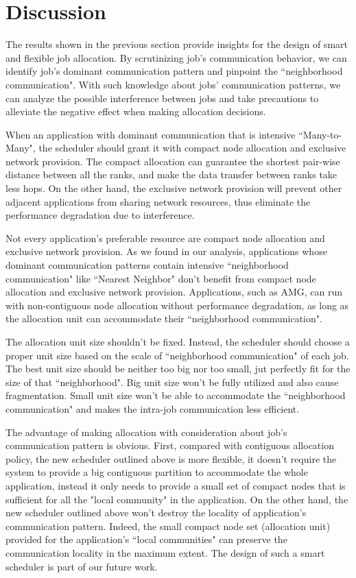 
\section{Discussion}
\label{sec:discussion}

The results shown in the previous section provide insights for the design of smart and flexible job allocation. By scrutinizing job's communication behavior, we can identify job's dominant communication pattern and pinpoint the ``neighborhood communication". With such knowledge about jobs' communication patterns, we can analyze the possible interference between jobs and take precautions to alleviate the negative effect when making allocation decisions. 

When an application with dominant communication that is intensive ``Many-to-Many", the scheduler should grant it with compact node allocation and exclusive network provision. The compact allocation can guarantee the shortest pair-wise distance between all the ranks, and make the data transfer between ranks take less hops. On the other hand, the exclusive network provision will prevent other adjacent applications from sharing network resources, thus eliminate the performance degradation due to interference.

Not every application's preferable resource are compact node allocation and exclusive network provision. As we found in our analysis, applications whose dominant communication patterns contain intensive ``neighborhood communication" like ``Nearest Neighbor" don't benefit from compact node allocation and exclusive network provision. Applications, such as AMG, can run with non-contiguous node allocation without performance degradation, as long as the allocation unit can accommodate their ``neighborhood communication".

The allocation unit size shouldn't be fixed. Instead, the scheduler should choose a proper unit size based on the scale of ``neighborhood communication" of each job. The best unit size should be neither too big nor too small, jut perfectly fit for the size of that ``neighborhood". Big unit size won't be fully utilized and also cause fragmentation. Small unit size won't be able to accommodate the ``neighborhood communication" and makes the intra-job communication less efficient. 


The advantage of making allocation with consideration about job's communication pattern is obvious. First, compared with contiguous allocation policy, the new scheduler outlined above is more flexible, it doesn't require the system to provide a big contiguous partition to accommodate the whole application, instead it only needs to provide a small set of compact nodes that is sufficient for all the "local community" in the application. On the other hand, the new scheduler outlined above won't destroy the locality of application's communication pattern. Indeed, the small compact node set (allocation unit) provided for the application's  ``local communities" can preserve the communication locality in the maximum extent. The design of such a smart scheduler is part of our future work. 



